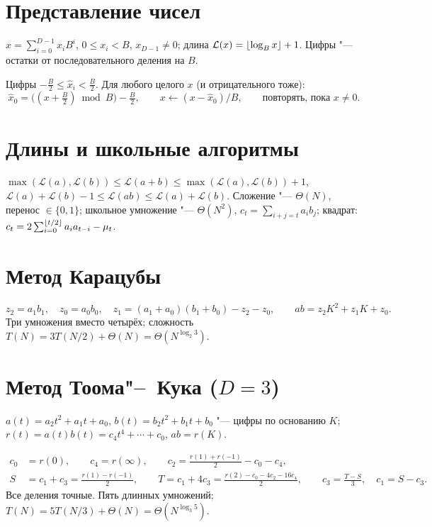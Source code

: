 \documentclass{ca-handout}
\begin{document}
\makehandouttitle

\section{Представление чисел}
$x = \sum_{i=0}^{D-1} x_i B^i$, $0 \le x_i < B$, $x_{D-1} \ne 0$; длина
$\mathcal{L}(x) = \lfloor\log_B x\rfloor + 1$. Цифры "--- остатки от последовательного деления на $B$.

\begin{reminder}[title={Сбалансированное представление ($B \ge 4$ чётно)}]
Цифры $-\frac B2 \le \hat x_i < \frac B2$. Для любого целого $x$ (и отрицательного тоже):
\[
  \hat x_0 = \bigl((x + \tfrac B2) \bmod B\bigr) - \tfrac B2, \qquad x \gets (x - \hat x_0)/B, \qquad
  \text{повторять, пока } x \ne 0.
\]
\end{reminder}

\section{Длины и школьные алгоритмы}
$\max(\mathcal{L}(a), \mathcal{L}(b)) \le \mathcal{L}(a + b) \le \max(\mathcal{L}(a), \mathcal{L}(b)) + 1$,
\quad $\mathcal{L}(a) + \mathcal{L}(b) - 1 \le \mathcal{L}(ab) \le \mathcal{L}(a) + \mathcal{L}(b)$.
Сложение "--- $\Theta(N)$, перенос $\in \{0, 1\}$; школьное умножение "--- $\Theta(N^2)$,
$c_t = \sum_{i+j=t} a_i b_j$; квадрат: $c_t = 2\sum_{i=0}^{\lfloor t/2\rfloor} a_i a_{t-i} - \mu_t$.

\section{Метод Карацубы}
\begin{reminder}[title={Один шаг: $a = a_1 K + a_0$, $b = b_1 K + b_0$, $K = B^k$, $k = \floor{n/2}$}]
\[
  z_2 = a_1 b_1, \quad z_0 = a_0 b_0, \quad z_1 = (a_1 + a_0)(b_1 + b_0) - z_2 - z_0, \qquad
  ab = z_2 K^2 + z_1 K + z_0.
\]
Три умножения вместо четырёх; сложность $T(N) = 3T(N/2) + \Theta(N) = \Theta(N^{\log_2 3})$.
\end{reminder}

\section{Метод Тоома"--~Кука ($D = 3$)}
$a(t) = a_2 t^2 + a_1 t + a_0$, $b(t) = b_2 t^2 + b_1 t + b_0$ "--- цифры по основанию $K$;
$r(t) = a(t)b(t) = c_4 t^4 + \cdots + c_0$, $ab = r(K)$.
\begin{reminder}[title={Точки $0, 1, -1, 2, \infty$ ($r(\infty) = a_2 b_2$)}]
\[
\begin{aligned}
  c_0 &= r(0), \qquad c_4 = r(\infty), \qquad c_2 = \tfrac{r(1) + r(-1)}{2} - c_0 - c_4,\\
  S &= c_1 + c_3 = \tfrac{r(1) - r(-1)}{2}, \qquad
  T = c_1 + 4c_3 = \tfrac{r(2) - c_0 - 4c_2 - 16c_4}{2}, \qquad
  c_3 = \tfrac{T - S}{3}, \quad c_1 = S - c_3.
\end{aligned}
\]
Все деления точные. Пять длинных умножений; $T(N) = 5T(N/3) + \Theta(N) = \Theta(N^{\log_3 5})$.
\end{reminder}
\end{document}
